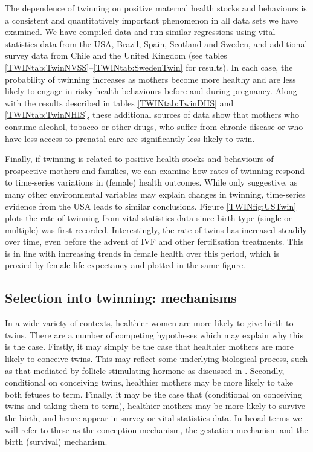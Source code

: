 \documentclass[subeqn]{article}
\begin{document}
\begin{spacing}{1.4}
The dependence of twinning on positive maternal health stocks and behaviours is
a consistent and quantitatively important phenomenon in all data sets we have
examined.  We have compiled data and run similar regressions using vital 
statistics data from the USA, Brazil, Spain, Scotland and Sweden, and 
additional survey data from Chile and the United Kingdom (see tables 
\ref{TWINtab:TwinNVSS}--\ref{TWINtab:SwedenTwin} for results).  In each case,
the probability of twinning increases as mothers become more healthy and are
less likely to engage in risky health behaviours before and during pregnancy.
Along with the results described in tables \ref{TWINtab:TwinDHS} and 
\ref{TWINtab:TwinNHIS}, these additional sources of data show that mothers
who consume alcohol, tobacco or other drugs, who suffer from chronic disease 
or who have less access to prenatal care are significantly less likely to twin.

Finally, if twinning is related to positive health stocks and behaviours of
prospective mothers and families, we can examine how rates of twinning respond
to time-series variations in (female) health outcomes.  While only suggestive,
as many other environmental variables may explain changes in twinning, 
time-series evidence from the USA leads to similar conclusions.  Figure
\ref{TWINfig:USTwin} plots the rate of twinning from vital statistics data since
birth type (single or multiple) was first recorded.  Interestingly, the rate of
twins has increased steadily over time, even before the advent of IVF and other
fertilisation treatments.  This is in line with increasing trends in female
health over this period, which is proxied by female life expectancy and plotted
in the same figure.


\subsection{Selection into twinning: mechanisms}   \label{TWINsscn:selection}
In a wide variety of contexts, healthier women are more likely to give birth to
twins.  There are a number of competing hypotheses which may explain why this is
the case.  Firstly, it may simply be the case that healthier mothers are more 
likely to conceive twins.  This may reflect some underlying biological process, 
such as that mediated by follicle stimulating hormone as discussed in 
\citet{Hall2003}.  Secondly, conditional on conceiving twins, healthier mothers 
may be more likely to take both fetuses to term.  Finally, it may be the case 
that (conditional on conceiving twins and taking them to term), healthier mothers 
may be more likely to survive the birth, and hence appear in survey or vital 
statistics data.  In broad terms we will refer to these as the conception 
mechanism, the gestation mechanism and the birth (survival) mechanism.


\end{spacing}
\end{document}
